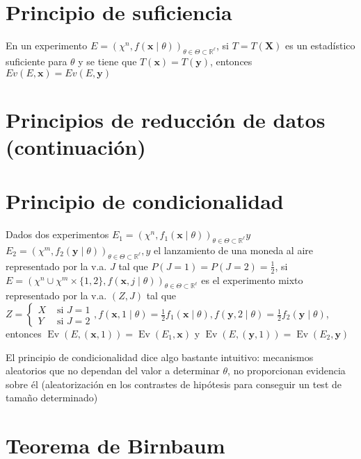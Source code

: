 \section*{Principio de suficiencia}
En un experimento $E=\left(\chi^{n}, f(\mathbf{x} \mid \theta)\right)_{\theta \in \Theta \subset \mathbb{R}^{\ell}}$, si $T=T(\mathbf{X})$ es un estadístico suficiente para $\theta$ y se tiene que $T(\mathbf{x})=T(\mathbf{y})$, entonces $E v(E, \mathbf{x})=E v(E, \mathbf{y})$

\section*{Principios de reducción de datos (continuación)}
\section*{Principio de condicionalidad}
Dados dos experimentos $E_{1}=\left(\chi^{n}, f_{1}(\mathbf{x} \mid \theta)\right)_{\theta \in \Theta \subset \mathbb{R}^{\ell}} y$ $E_{2}=\left(\chi^{m}, f_{2}(\mathbf{y} \mid \theta)\right)_{\theta \in \Theta \subset \mathbb{R}^{\ell}}, y$ el lanzamiento de una moneda al aire representado por la v.a. $J$ tal que $P(J=1)=P(J=2)=\frac{1}{2}$, si $E=\left(\chi^{n} \cup \chi^{m} \times\{1,2\}, f(\mathbf{x}, j \mid \theta)\right)_{\theta \in \Theta \subset \mathbb{R}^{\ell}}$ es el experimento mixto representado por la v.a. $(Z, J)$ tal que $Z=\left\{\begin{array}{ll}X & \text { si } J=1 \\ Y & \text { si } J=2\end{array}, f(\mathbf{x}, 1 \mid \theta)=\frac{1}{2} f_{1}(\mathbf{x} \mid \theta), f(\mathbf{y}, 2 \mid \theta)=\frac{1}{2} f_{2}(\mathbf{y} \mid \theta)\right.$, entonces $\operatorname{Ev}(E,(\mathbf{x}, 1))=\operatorname{Ev}\left(E_{1}, \mathbf{x}\right)$ y $\operatorname{Ev}(E,(\mathbf{y}, 1))=\operatorname{Ev}\left(E_{2}, \mathbf{y}\right)$

El principio de condicionalidad dice algo bastante intuitivo: mecanismos aleatorios que no dependan del valor a determinar $\theta$, no proporcionan evidencia sobre él (aleatorización en los contrastes de hipótesis para conseguir un test de tamaño determinado)

\section*{Teorema de Birnbaum}
